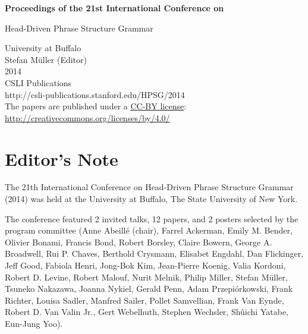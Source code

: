 \documentclass[11pt,a4paper,fleqn]{article}
\begin{document}
\begin{center}
{\Large
                {\bfseries Proceedings of the 21st International Conference on\par Head-Driven Phrase Structure Grammar\par}

                \vspace{8ex}

                     University at Buffalo\\[\baselineskip]

                        Stefan M{\"u}ller (Editor)\\[\baselineskip]

                                2014\\[\baselineskip]

                          CSLI Publications\\[\baselineskip]

              http://csli-publications.stanford.edu/HPSG/2014 \\[4\baselineskip]

The papers are published under a \href{http://creativecommons.org/licenses/by/4.0/}{CC-BY license}:\\[3pt]
\href{http://creativecommons.org/licenses/by/4.0/}{http://creativecommons.org/licenses/by/4.0/}
}
\end{center}
\newpage
\tableofcontents

\newpage

\section{Editor's Note}
The 21th International Conference on Head-Driven Phrase Structure Grammar (2014) was held at the
University at Buffalo, The State University of New York.

The conference featured 2 invited talks, 12 papers, and 2 posters selected by the program committee 
(Anne Abeillé (chair),
Farrel Ackerman,
Emily M. Bender,
Olivier Bonami,
Francis Bond,
Robert Borsley,
Claire Bowern,
George A. Broadwell,
Rui P. Chaves,
Berthold Crysmann,
Elisabet Engdahl,
Dan Flickinger,
Jeff Good,
Fabiola Henri,
Jong-Bok Kim,
Jean-Pierre Koenig,
Valia Kordoni,
Robert D. Levine,
Robert Malouf,
Nurit Melnik,
Philip Miller,
Stefan Müller,
Tsuneko Nakazawa,
Joanna Nykiel,
Gerald Penn,
Adam Przepiórkowski,
Frank Richter,
Louisa Sadler,
Manfred Sailer,
Pollet Samvellian,
Frank Van Eynde,
Robert D. Van Valin Jr.,
Gert Webelhuth,
Stephen Wechsler,
Shûichi Yatabe,
Eun-Jung Yoo).
\end{document}
